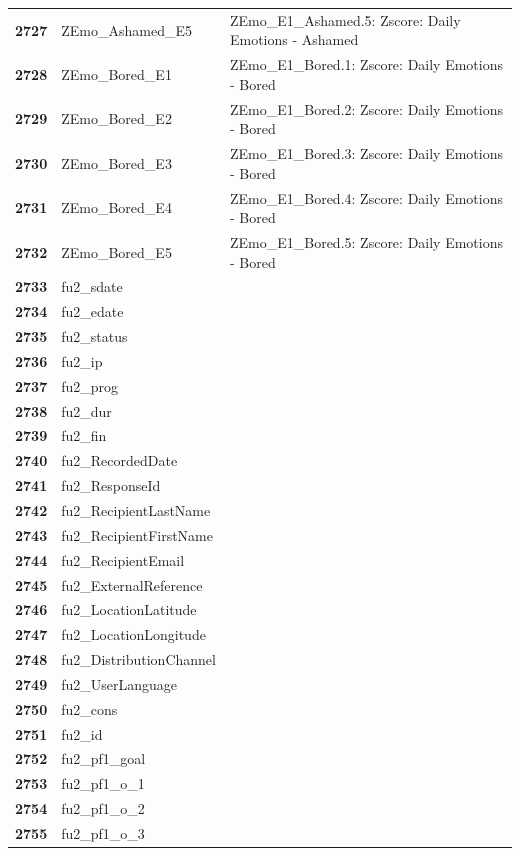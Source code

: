 \documentclass[
  letterpaper,
  DIV=11,
  numbers=noendperiod]{scrartcl}
\begin{document}
\begin{longtable}[t]{>{}cll}
\textbf{2727} & ZEmo\_Ashamed\_E5 & ZEmo\_E1\_Ashamed.5: Zscore:  Daily Emotions - Ashamed\\
\textbf{2728} & ZEmo\_Bored\_E1 & ZEmo\_E1\_Bored.1: Zscore:  Daily Emotions - Bored\\
\textbf{2729} & ZEmo\_Bored\_E2 & ZEmo\_E1\_Bored.2: Zscore:  Daily Emotions - Bored\\
\textbf{2730} & ZEmo\_Bored\_E3 & ZEmo\_E1\_Bored.3: Zscore:  Daily Emotions - Bored\\
\addlinespace
\textbf{2731} & ZEmo\_Bored\_E4 & ZEmo\_E1\_Bored.4: Zscore:  Daily Emotions - Bored\\
\textbf{2732} & ZEmo\_Bored\_E5 & ZEmo\_E1\_Bored.5: Zscore:  Daily Emotions - Bored\\
\textbf{2733} & fu2\_sdate & \\
\textbf{2734} & fu2\_edate & \\
\textbf{2735} & fu2\_status & \\
\addlinespace
\textbf{2736} & fu2\_ip & \\
\textbf{2737} & fu2\_prog & \\
\textbf{2738} & fu2\_dur & \\
\textbf{2739} & fu2\_fin & \\
\textbf{2740} & fu2\_RecordedDate & \\
\addlinespace
\textbf{2741} & fu2\_ResponseId & \\
\textbf{2742} & fu2\_RecipientLastName & \\
\textbf{2743} & fu2\_RecipientFirstName & \\
\textbf{2744} & fu2\_RecipientEmail & \\
\textbf{2745} & fu2\_ExternalReference & \\
\addlinespace
\textbf{2746} & fu2\_LocationLatitude & \\
\textbf{2747} & fu2\_LocationLongitude & \\
\textbf{2748} & fu2\_DistributionChannel & \\
\textbf{2749} & fu2\_UserLanguage & \\
\textbf{2750} & fu2\_cons & \\
\addlinespace
\textbf{2751} & fu2\_id & \\
\textbf{2752} & fu2\_pf1\_goal & \\
\textbf{2753} & fu2\_pf1\_o\_1 & \\
\textbf{2754} & fu2\_pf1\_o\_2 & \\
\textbf{2755} & fu2\_pf1\_o\_3 & \\

\end{longtable}
\end{document}
